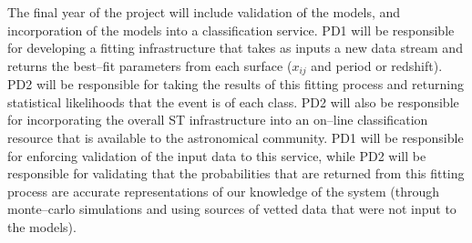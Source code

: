  \smallskip

The final year of the project will include validation of the models, and
incorporation of the models into a classification service.  PD1 will be
responsible for developing a fitting infrastructure that takes as inputs a new
data stream and returns the best--fit parameters from each surface ($x_{ij}$ and
period or redshift).  PD2 will be responsible for taking the results of this
fitting process and returning statistical likelihoods that the event is of each
class.  PD2 will also be responsible for incorporating the overall ST
infrastructure into an on--line classification resource that is available to the
astronomical community. PD1 will be responsible for enforcing validation of the
input data to this service, while PD2 will be responsible for validating that
the probabilities that are returned from this fitting process are accurate
representations of our knowledge of the system (through monte--carlo simulations
and using sources of vetted data that were not input to the models).
